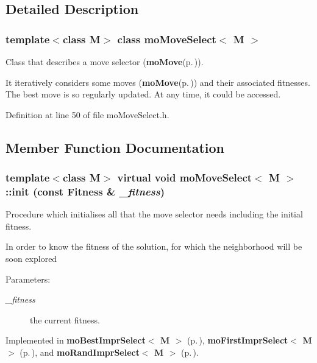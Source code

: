 \subsection{Detailed Description}
\subsubsection*{template$<$class M$>$ class mo\-Move\-Select$<$ M $>$}

Class that describes a move selector ({\bf mo\-Move}{\rm (p.\,\pageref{classmo_move})}). 

It iteratively considers some moves ({\bf mo\-Move}{\rm (p.\,\pageref{classmo_move})}) and their associated fitnesses. The best move is so regularly updated. At any time, it could be accessed. 



Definition at line 50 of file mo\-Move\-Select.h.

\subsection{Member Function Documentation}
\subsubsection{\setlength{\rightskip}{0pt plus 5cm}template$<$class M$>$ virtual void {\bf mo\-Move\-Select}$<$ M $>$::init (const {\bf Fitness} \& {\em \_\-fitness})\hspace{0.3cm}{\tt  [pure virtual]}}\label{classmo_move_select_a0}


Procedure which initialises all that the move selector needs including the initial fitness. 

In order to know the fitness of the solution, for which the neighborhood will be soon explored

\begin{Desc}
\item[Parameters:]
\begin{description}
\item[{\em \_\-fitness}]the current fitness. \end{description}
\end{Desc}


Implemented in {\bf mo\-Best\-Impr\-Select$<$ M $>$} {\rm (p.\,\pageref{classmo_best_impr_select_a0})}, {\bf mo\-First\-Impr\-Select$<$ M $>$} {\rm (p.\,\pageref{classmo_first_impr_select_a0})}, and {\bf mo\-Rand\-Impr\-Select$<$ M $>$} {\rm (p.\,\pageref{classmo_rand_impr_select_a0})}.

